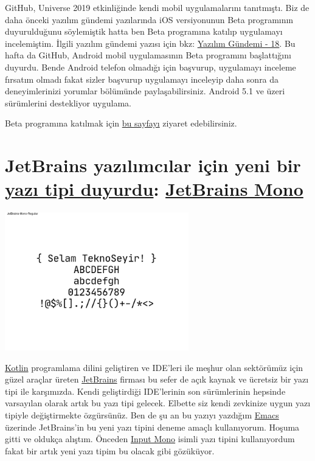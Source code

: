 \documentclass[11pt]{article}
\begin{document}
GitHub, Universe 2019 etkinliğinde kendi mobil uygulamalarını tanıtmıştı. Biz
de daha önceki yazılım gündemi yazılarında iOS versiyonunun Beta programının
duyurulduğunu söylemiştik hatta ben Beta programına katılıp uygulamayı
incelemiştim. İlgili yazılım gündemi yazısı için bkz: \href{../../2019/18/yazilim-gundemi-18.pdf}{Yazılım Gündemi - 18}. Bu
hafta da GitHub, Android mobil uygulamasının Beta programını başlattığını
duyurdu. Bende Android telefon olmadığı için başvurup, uygulamayı inceleme
fırsatım olmadı fakat sizler başvurup uygulamayı inceleyip daha sonra da
deneyimlerinizi yorumlar bölümünde paylaşabilirsiniz. Android 5.1 ve üzeri
sürümlerini destekliyor uygulama.

Beta programına katılmak için \href{https://github.com/mobile}{bu sayfayı} ziyaret edebilirsiniz.
\section{JetBrains yazılımcılar için yeni bir \href{https://blog.jetbrains.com/blog/2020/01/15/jetbrains-mono-a-new-font-made-for-developers/}{yazı tipi duyurdu}: \href{https://www.jetbrains.com/lp/mono/}{JetBrains Mono}}
\label{sec:org81167c0}
\begin{center}
\includegraphics[height=6cm]{gorseller/jetbrains-mono-demo.png}
\end{center}

\href{https://kotlinlang.org/}{Kotlin} programlama dilini geliştiren ve IDE'leri ile meşhur olan sektörümüz
için güzel araçlar üreten \href{https://www.jetbrains.com/}{JetBrains} firması bu sefer de açık kaynak ve ücretsiz
bir yazı tipi ile karşımızda. Kendi geliştirdiği IDE'lerinin son sürümlerinin
hepsinde varsayılan olarak artık bu yazı tipi gelecek. Elbette siz kendi
zevkinize uygun yazı tipiyle değiştirmekte özgürsünüz. Ben de şu an bu yazıyı
yazdığım \href{https://www.gnu.org/software/emacs/}{Emacs} üzerinde JetBrains'in bu yeni yazı tipini deneme amaçlı
kullanıyorum. Hoşuma gitti ve oldukça alıştım. Önceden \href{https://input.fontbureau.com/}{Input Mono} isimli yazı
tipini kullanıyordum fakat bir artık yeni yazı tipim bu olacak gibi gözüküyor.
\end{document}
